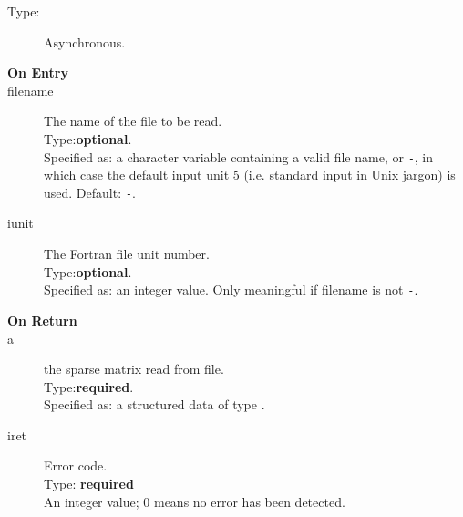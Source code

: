 

\begin{description}
\item[Type:] Asynchronous.
\item[\bf  On Entry ]
\item[filename] The name of the file to be read.\\
Type:{\bf optional}.\\
Specified as: a character variable containing a valid file name, or
\verb|-|, in which case the default input unit  5 (i.e. standard input
in Unix jargon) is used. Default: \verb|-|. 
\item[iunit] The Fortran file unit number.\\
Type:{\bf optional}.\\
Specified as: an integer value. Only meaningful if filename is not \verb|-|.
\end{description}

\begin{description}
\item[\bf On Return]
\item[a] the sparse matrix read from file.\\
Type:{\bf required}.\\
Specified as: a structured data of type \spdata.
\item[iret] Error code.\\
Type: {\bf required} \\
An integer value; 0 means no error has been detected. 
\end{description}



